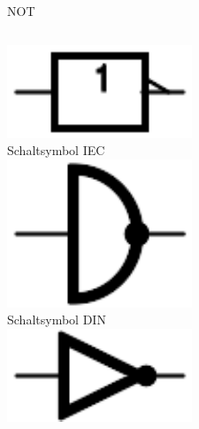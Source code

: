 \begin{frame}{NOT}
  \begin{columns}
    \includegraphics[width=\textwidth,height=.2\textheight,keepaspectratio]{a14/NOT_IEC.pdf}\\
    {\small Schaltsymbol IEC}\\
    \includegraphics[width=\textwidth,height=.2\textheight,keepaspectratio]{a14/NOT_DIN.pdf}\\
    {\small Schaltsymbol DIN}\\
    \includegraphics[width=\textwidth,height=.2\textheight,keepaspectratio]{a14/NOT_ANSI.pdf}\\

\end{columns}
\end{frame}
